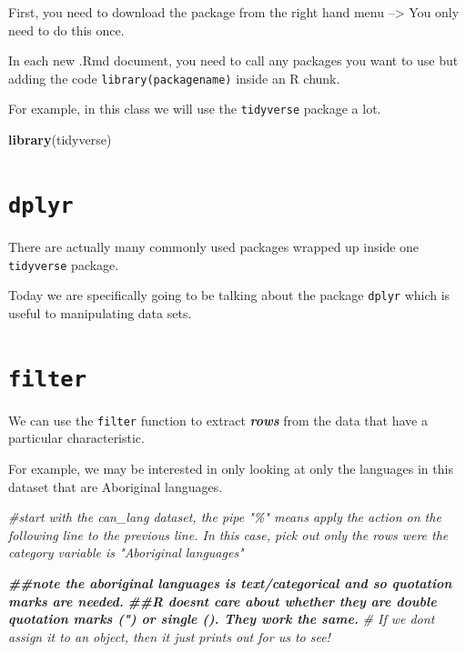 \documentclass[
]{article}
\newenvironment{Shaded}{\begin{snugshade}}{\end{snugshade}}
\newcommand{\CommentTok}[1]{\textcolor[rgb]{0.56,0.35,0.01}{\textit{#1}}}
\newcommand{\DocumentationTok}[1]{\textcolor[rgb]{0.56,0.35,0.01}{\textbf{\textit{#1}}}}
\newcommand{\FunctionTok}[1]{\textcolor[rgb]{0.13,0.29,0.53}{\textbf{#1}}}
\newcommand{\NormalTok}[1]{#1}
\begin{document}
First, you need to download the package from the right hand menu
--\textgreater{} You only need to do this once.

In each new .Rmd document, you need to call any packages you want to use
but adding the code \texttt{library(packagename)} inside an R chunk.

For example, in this class we will use the \texttt{tidyverse} package a
lot.

\begin{Shaded}
\begin{Highlighting}[]
\FunctionTok{library}\NormalTok{(tidyverse)}
\end{Highlighting}
\end{Shaded}

\hypertarget{dplyr}{%
\section{\texorpdfstring{\texttt{dplyr}}{dplyr}}\label{dplyr}}

There are actually many commonly used packages wrapped up inside one
\texttt{tidyverse} package.

Today we are specifically going to be talking about the package
\texttt{dplyr} which is useful to manipulating data sets.

\hypertarget{filter}{%
\section{\texorpdfstring{\texttt{filter}}{filter}}\label{filter}}

We can use the \texttt{filter} function to extract \textbf{\emph{rows}}
from the data that have a particular characteristic.

For example, we may be interested in only looking at only the languages
in this dataset that are Aboriginal languages.

\begin{Shaded}
\begin{Highlighting}[]
\CommentTok{\#start with the can\_lang dataset, the pipe "\%" means apply the action on the following line to the previous line. In this case, pick out only the rows were the category variable is "Aboriginal languages" }




\DocumentationTok{\#\#note the aboriginal languages is text/categorical and so quotation marks are needed. }
\DocumentationTok{\#\#R doesn\textquotesingle{}t care about whether they are double quotation marks (") or single (\textquotesingle{}). They work the same. }
\CommentTok{\# If we don\textquotesingle{}t assign it to an object, then it just prints out for us to see! }
\end{Highlighting}
\end{Shaded}
\end{document}
